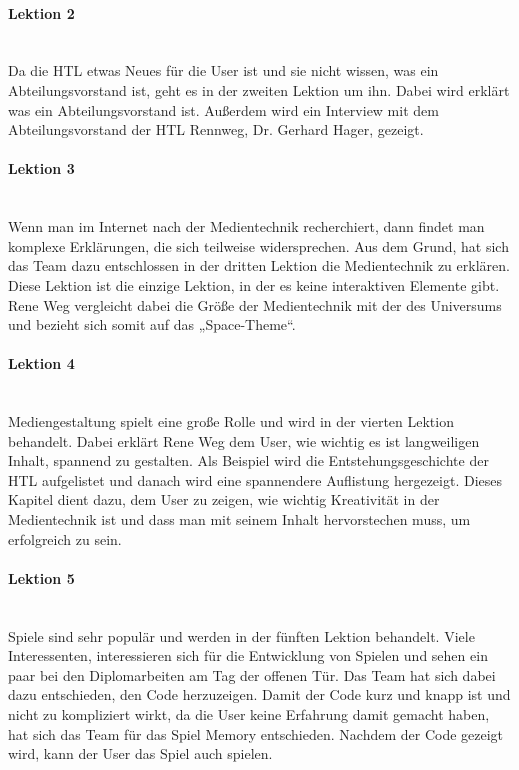 \paragraph{Lektion 2}\\
Da die HTL etwas Neues für die User ist und sie nicht wissen, was ein Abteilungsvorstand ist, geht es in der zweiten Lektion um ihn. Dabei wird erklärt was ein Abteilungsvorstand ist. Außerdem wird ein Interview mit dem Abteilungsvorstand der HTL Rennweg, Dr. Gerhard Hager, gezeigt. 

\paragraph{Lektion 3}\\
Wenn man im Internet nach der Medientechnik recherchiert, dann findet man komplexe Erklärungen, die sich teilweise widersprechen. Aus dem Grund, hat sich das Team dazu entschlossen in der dritten Lektion die Medientechnik zu erklären. Diese Lektion ist die einzige Lektion, in der es keine interaktiven Elemente gibt. Rene Weg vergleicht dabei die Größe der Medientechnik mit der des Universums und bezieht sich somit auf das „Space-Theme“. 

\paragraph{Lektion 4}\\
Mediengestaltung spielt eine große Rolle und wird in der vierten Lektion behandelt. Dabei erklärt Rene Weg dem User, wie wichtig es ist langweiligen Inhalt, spannend zu gestalten. Als Beispiel wird die Entstehungsgeschichte der HTL aufgelistet und danach wird eine spannendere Auflistung hergezeigt. Dieses Kapitel dient dazu, dem User zu zeigen, wie wichtig Kreativität in der Medientechnik ist und dass man mit seinem Inhalt hervorstechen muss, um erfolgreich zu sein.

\paragraph{Lektion 5}\\
Spiele sind sehr populär und werden in der fünften Lektion behandelt. Viele Interessenten, interessieren sich für die Entwicklung von Spielen und sehen ein paar bei den Diplomarbeiten am Tag der offenen Tür. Das Team hat sich dabei dazu entschieden, den Code herzuzeigen. Damit der Code kurz und knapp ist und nicht zu kompliziert wirkt, da die User keine Erfahrung damit gemacht haben, hat sich das Team für das Spiel Memory entschieden. Nachdem der Code gezeigt wird, kann der User das Spiel auch spielen.

